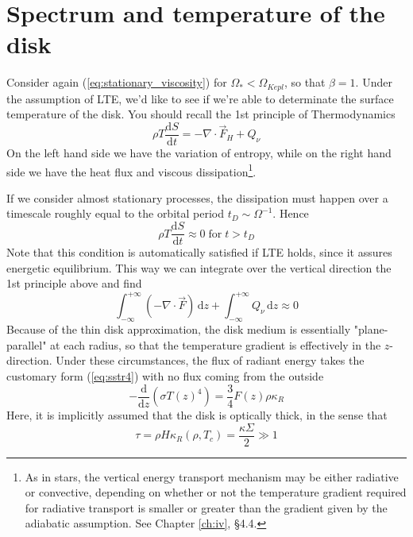 \section{Spectrum and temperature of the disk}
\par Consider again (\ref{eq:stationary_viscosity}) for $\Omega_{*}<\Omega_{Kepl}$, so that $\beta = 1$. Under the assumption of LTE, we'd like to see if we're able to determinate the surface temperature of the disk. You should recall the 1st principle of Thermodynamics
\begin{equation*}
    \rho T \frac{\text{d}S}{\text{d}t} = -\nabla\cdot\vec{F}_{H}+Q_{\nu}
\end{equation*}
On the left hand side we have the variation of entropy, while on the right hand side we have the heat flux and viscous dissipation\footnote{As in stars, the vertical energy transport mechanism may be either radiative or convective, depending on whether or not the temperature gradient required for radiative transport is smaller or greater than the gradient given by the adiabatic assumption. See Chapter \ref{ch:iv}, §4.4.}.
\par If we consider almost stationary processes, the dissipation must happen over a timescale roughly equal to the orbital period $t_{D}\sim\Omega^{-1}$. Hence 
\begin{equation*}
     \rho T \frac{\text{d}S}{\text{d}t} \approx 0 \;\text{for}\; t>t_{D}
\end{equation*}
Note that this condition is automatically satisfied if LTE holds, since it assures energetic equilibrium. This way we can integrate over the vertical direction the 1st principle above and find
\begin{equation*}
    \int_{-\infty}^{+\infty}(-\nabla\cdot\vec{F})\,\text{d}z + \int_{-\infty}^{+\infty}Q_{\nu}\,\text{d}z \approx 0
\end{equation*}
Because of the thin disk approximation, the disk medium is essentially "plane-parallel" at each radius, so that the temperature gradient is effectively in the $z$-direction. Under these circumstances, the flux of radiant energy takes the customary form (\ref{eq:sstr4}) with no flux coming from the outside
\begin{equation*}
    -\frac{\text{d}}{\text{d}z}(\sigma T(z)^{4}) = \frac{3}{4}F(z)\rho\kappa_{R}
\end{equation*}
Here, it is implicitly assumed that the disk is optically thick, in the sense that 
\begin{equation*}
    \tau = \rho H \kappa_{R}(\rho, T_{c}) = \frac{\kappa\Sigma}{2} \gg 1
\end{equation*}
